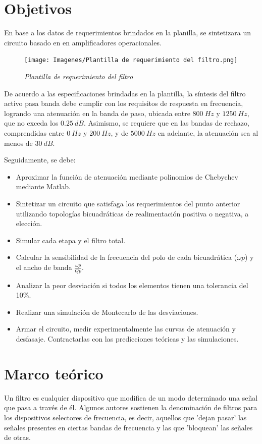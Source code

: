 \documentclass[12pt,A4paper,titlepage]{article}
\begin{document}
\newpage
\section{Objetivos}
\hspace{1mm} En base a los datos de requerimientos brindados en la planilla, se sintetizara un circuito basado en en amplificadores operacionales.

\begin{figure}[!h] 
  \centering
  \texttt{[image: Imagenes/Plantilla de requerimiento del filtro.png]}
  \caption{\textit{Plantilla de requerimiento del filtro}}
\end{figure}


\hspace{1mm} De acuerdo a las especificaciones brindadas en la plantilla, la síntesis del filtro activo pasa banda debe cumplir con los requisitos de respuesta en frecuencia, logrando una atenuación en la banda de paso, ubicada entre \(800~Hz\) y \(1250~Hz\), que no exceda los \(0.25~dB\). Asimismo, se requiere que en las bandas de rechazo, comprendidas entre \(0~Hz\) y \(200~Hz\), y de \(5000~Hz\) en adelante, la atenuación sea al menos de \(30~dB\).

\bigskip
\hspace{1mm} Seguidamente, se debe:
\begin{itemize}[itemsep=1pt]
    \item Aproximar la función de atenuación mediante polinomios de Chebychev mediante Matlab.
    \item Sintetizar un circuito que satisfaga los requerimientos del punto anterior utilizando topologías bicuadráticas de realimentación positiva o negativa, a elección.
    \item Simular cada etapa y el filtro total.
    \item Calcular la sensibilidad de la frecuencia del polo de cada bicuadrática (\(\omega p\)) y el ancho de banda \(\frac{\omega p}{Qp}\).
    \item Analizar la peor desviación si todos los elementos tienen una tolerancia del 10\%.
    \item Realizar una simulación de Montecarlo de las desviaciones.
    \item Armar el circuito, medir experimentalmente las curvas de atenuación y desfasaje. Contractarlas con las predicciones teóricas y las simulaciones.
\end{itemize}

\newpage
\section{Marco teórico}
\hspace{1mm} Un filtro es cualquier dispositivo que modifica de un modo determinado una señal que pasa a través de él. Algunos autores sostienen la denominación de filtros para los dispositivos selectores de frecuencia, es decir, aquellos que 'dejan pasar' las señales presentes en ciertas bandas de frecuencia y las que 'bloquean' las señales de otras.
\end{document}
